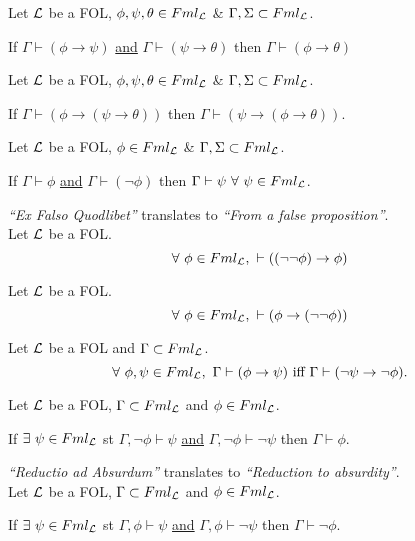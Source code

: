 \documentclass[11pt,a4paper]{article}
\begin{document}
Let $\mathcal{L}$ be a FOL, $\phi,\psi,\theta\in Fml_{\mathcal{L}}$ \& $\Gamma,\Sigma\subset Fml_{\mathcal{L}}$.
\begin{center}If $\Gamma\vdash(\phi\to\psi)$ \underline{and} $\Gamma\vdash(\psi\to\theta)$ then $\Gamma\vdash(\phi\to\theta)$\end{center}

Let $\mathcal{L}$ be a FOL, $\phi,\psi,\theta\in Fml_{\mathcal{L}}$ \& $\Gamma,\Sigma\subset Fml_{\mathcal{L}}$.
\begin{center}If $\Gamma\vdash(\phi\to(\psi\to\theta))$ then $\Gamma\vdash(\psi\to(\phi\to\theta))$.\end{center}

Let $\mathcal{L}$ be a FOL, $\phi\in Fml_{\mathcal{L}}$ \& $\Gamma,\Sigma\subset Fml_{\mathcal{L}}$.
\begin{center}
If $\Gamma\vdash\phi$ \underline{and} $\Gamma\vdash(\neg\phi)$ then $\Gamma\vdash\psi\ \forall\ \psi\in Fml_{\mathcal{L}}$.
\end{center}
\nb \textit{``Ex Falso Quodlibet''} translates to \textit{``From a false proposition''}.\\

Let $\mathcal{L}$ be a FOL.
$$\forall\ \phi\in Fml_\LL,\ \vdash((\neg\neg\phi)\to\phi)$$

Let $\mathcal{L}$ be a FOL.
$$\forall\ \phi\in Fml_\LL,\ \vdash(\phi\to(\neg\neg\phi))$$

Let $\mathcal{L}$ be a FOL and $\Gamma\subset Fml_{\mathcal{L}}$.
$$\forall\ \phi,\psi\in Fml_\LL,\ \Gamma\vdash(\phi\to\psi)\text{ iff }\Gamma\vdash(\neg\psi\to\neg\phi).$$

Let $\mathcal{L}$ be a FOL, $\Gamma\subset Fml_{\mathcal{L}}$ and $\phi\in Fml_{\mathcal{L}}$.
\begin{center}
If $\exists\ \psi\in Fml_{\mathcal{L}}$ st $\Gamma,\neg\phi\vdash\psi$ \underline{and} $\Gamma,\neg\phi\vdash\neg\psi$ then $\Gamma\vdash\phi$.
\end{center}
\nb \textit{``Reductio ad Absurdum''} translates to \textit{``Reduction to absurdity''}.\\

Let $\mathcal{L}$ be a FOL, $\Gamma\subset Fml_{\mathcal{L}}$ and $\phi\in Fml_{\mathcal{L}}$.
\begin{center}
If $\exists\ \psi\in Fml_{\mathcal{L}}$ st $\Gamma,\phi\vdash\psi$ \underline{and} $\Gamma,\phi\vdash\neg\psi$ then $\Gamma\vdash\neg\phi$.
\end{center}
\end{document}
